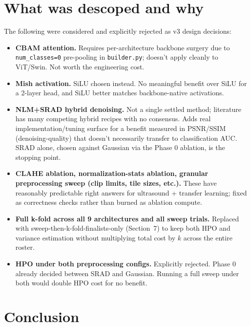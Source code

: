 \documentclass[10pt,a4paper]{article}
\begin{document}
\section{What was descoped and why}

The following were considered and explicitly rejected as v3 design
decisions:

\begin{itemize}[leftmargin=]
  \item \textbf{CBAM attention.} Requires per-architecture backbone
        surgery due to \texttt{num\_classes=0} pre-pooling in
        \texttt{builder.py}; doesn't apply cleanly to ViT/Swin. Not
        worth the engineering cost.
  \item \textbf{Mish activation.} SiLU chosen instead. No meaningful
        benefit over SiLU for a 2-layer head, and SiLU better matches
        backbone-native activations.
  \item \textbf{NLM+SRAD hybrid denoising.} Not a single settled
        method; literature has many competing hybrid recipes with no
        consensus. Adds real implementation/tuning surface for a
        benefit measured in PSNR/SSIM (denoising-quality) that doesn't
        necessarily transfer to classification AUC. SRAD alone, chosen
        against Gaussian via the Phase 0 ablation, is the stopping
        point.
  \item \textbf{CLAHE ablation, normalization-stats ablation,
        granular preprocessing sweep (clip limits, tile sizes,
        etc.).} These have reasonably predictable right answers for
        ultrasound + transfer learning; fixed as correctness checks
        rather than burned as ablation compute.
  \item \textbf{Full k-fold across all 9 architectures and all sweep
        trials.} Replaced with sweep-then-k-fold-finalists-only
        (Section~7) to keep both HPO and variance estimation without
        multiplying total cost by $k$ across the entire roster.
  \item \textbf{HPO under both preprocessing configs.} Explicitly
        rejected. Phase 0 already decided between SRAD and Gaussian.
        Running a full sweep under both would double HPO cost for no
        benefit.
\end{itemize}

\section{Conclusion}
\end{document}
